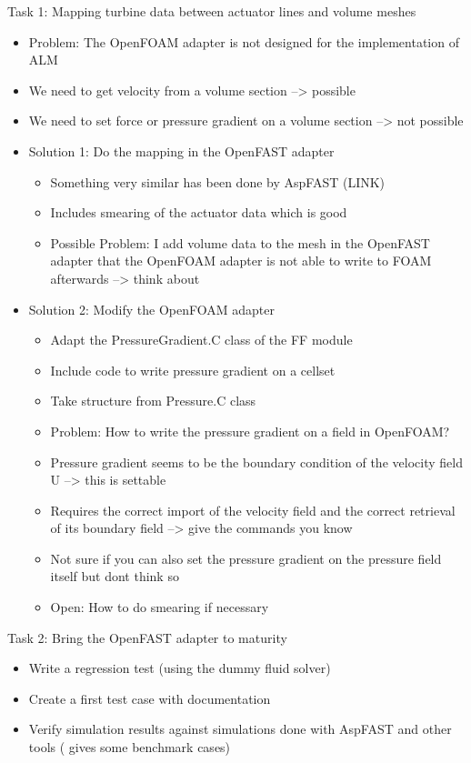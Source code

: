 Task 1: Mapping turbine data between actuator lines and volume meshes
\begin{itemize}
	\item Problem: The OpenFOAM adapter is not designed for the implementation of ALM
	\item We need to get velocity from a volume section --> possible
	\item We need to set force or pressure gradient on a volume section --> not possible
	\item Solution 1: Do the mapping in the OpenFAST adapter
	\begin{itemize}
		\item Something very similar has been done by AspFAST (LINK)
		\item Includes smearing of the actuator data which is good
		\item Possible Problem: I add volume data to the mesh in the OpenFAST adapter that the OpenFOAM adapter is not able to write to FOAM afterwards --> think about
	\end{itemize}
	\item Solution 2: Modify the OpenFOAM adapter
		\begin{itemize}
			\item Adapt the PressureGradient.C class of the FF module
			\item Include code to write pressure gradient on a cellset
			\item Take structure from Pressure.C class
			\item Problem: How to write the pressure gradient on a field in OpenFOAM?
			\item Pressure gradient seems to be the boundary condition of the velocity field U --> this is settable
			\item Requires the correct import of the velocity field and the correct retrieval of its boundary field --> give the commands you know
			\item Not sure if you can also set the pressure gradient on the pressure field itself but dont think so
			\item Open: How to do smearing if necessary\\
		\end{itemize}
\end{itemize}

Task 2: Bring the OpenFAST adapter to maturity
\begin{itemize}
	\item Write a regression test (using the dummy fluid solver)
	\item Create a first test case with documentation
	\item Verify simulation results against simulations done with AspFAST and other tools (\cite{Taschner:2022} gives some benchmark cases)\\
\end{itemize}

